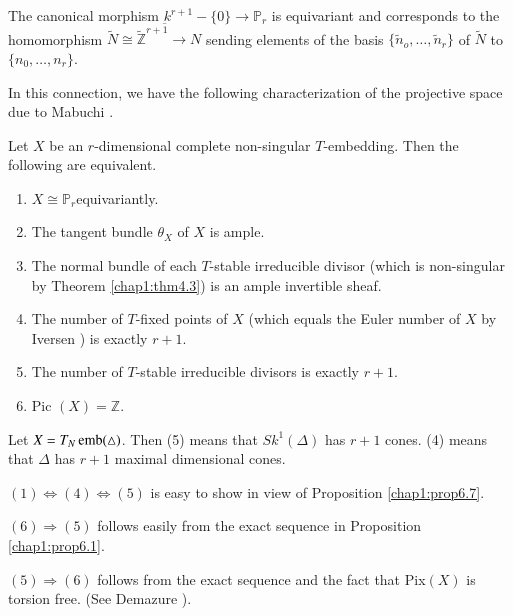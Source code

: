  	The canonical morphism $\underbar{k}^{r+1} - \{0\} \to
        \mathbb{P}_{r}$ is equivariant and corresponds to the
        homomorphism $\tilde{N} \cong \tilde{\mathbb{Z}}^{r+1} \to N$
        sending elements of the basis $\{\tilde{n}_{o}, \ldots ,
        \tilde{n}_{r}\}$ of $ \tilde{N}$ to $ \{n_{0}, \ldots ,
        n_{r}\}$.  
 
 	In this connection, we have the following characterization of
        the projective space due to Mabuchi \cite{keyM1}.  

 \begin{theorem}[Mabuchi]\label{chap1:thm7.1} %
 Let $X$ be an $r$-dimensional complete non-singular
   $T$-embedding. Then the following are equivalent.  
\begin{enumerate}[(1)]
\item $X \cong \mathbb{P}_{r}$\pageoriginale equivariantly. 

\item The tangent bundle $\theta_{X}$ of $X$ is ample. 

\item The normal bundle of each $T$-stable irreducible divisor (which
  is non-singular by Theorem \ref{chap1:thm4.3}) is an ample invertible sheaf.  

\item The number of $T$-fixed points of $X$ (which equals the Euler
  number of $X$ by Iversen \cite{keyI6}) is exactly $r + 1$.  

\item The number of $T$-stable irreducible divisors is exactly $r+1$. 

\item Pic $(X) = \mathbb{Z}$.
\end{enumerate}
 \end{theorem} 
 
	 Let $X = T_{N}\operatorname{emb}(\triangle)$. Then (5) means that
         $Sk^{1}(\Delta)$ has $r + 1$ cones. (4) means that $\Delta$
         has $r + 1$ maximal dimensional cones. 
 
 \noindent
 $(1) \Leftrightarrow (4) \Leftrightarrow (5)$ is easy to show in view
 of Proposition \ref{chap1:prop6.7}.  
 
 \noindent
 $(6) \Rightarrow (5) $ follows easily from the exact sequence in
 Proposition \ref{chap1:prop6.1}. 
 
 \noindent
 $(5) \Rightarrow (6)$ follows from the exact sequence and the fact
 that Pix$(X)$ is torsion free. (See Demazure \cite[p.566]{keyD2}).  
 
